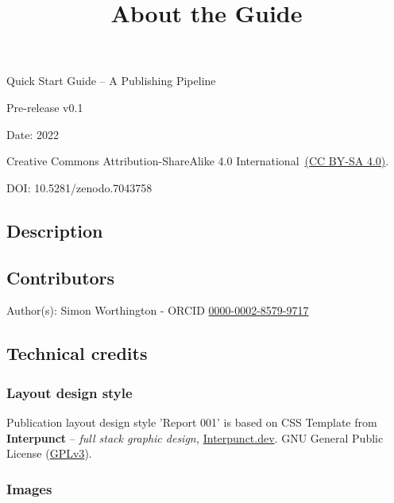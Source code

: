 \documentclass{article}
\begin{document}
\title{About the Guide}

\maketitle


Quick Start Guide – A Publishing Pipeline


Pre-release v0.1


Date: 2022


Creative Commons Attribution-ShareAlike 4.0 International \href{https://creativecommons.org/licenses/by-sa/4.0/}{(CC BY-SA 4.0)}.


DOI: 10.5281/zenodo.7043758


\subsection{Description}\label{H8229716}






\subsection{Contributors}\label{H5465299}



Author(s): Simon Worthington - ORCID \href{https://orcid.org/0000-0002-8579-9717}{0000-0002-8579-9717}


\subsection{Technical credits}\label{H2281570}



\subsubsection{Layout design style}\label{H2431584}



Publication layout design style 'Report 001' is based on CSS Template from \textbf{Interpunct} – \emph{full stack graphic design,} \href{https://interpunct.dev/}{Interpunct.dev}. GNU General Public License (\href{https://www.gnu.org/licenses/gpl-3.0.html}{GPLv3}).


\subsubsection{Images}\label{H3168740}
\end{document}
